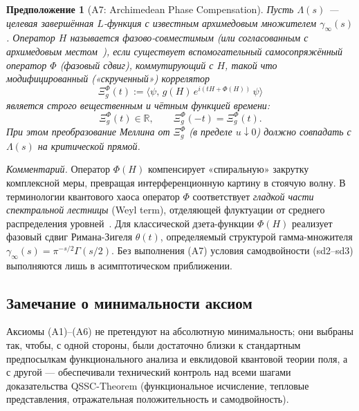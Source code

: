 \documentclass{article}
\numberwithin{equation}{section}
\theoremstyle{plain}
\newtheorem{assumption}{Предположение}[section]
\theoremstyle{definition}
\theoremstyle{remark}
\def\theta{θ}\def\Theta{Θ}\def\pi{π}\def\Pi{Π}%
\def\infty{∞}\def\partial{∂}\def\sum{Σ}\def\int{∫}%
\begin{document}
\begin{assumption}[A7: Archimedean Phase Compensation]
Пусть $\Lambda(s)$ — целевая завершённая $L$-функция с известным архимедовым множителем $\gamma_\infty(s)$.
Оператор $H$ называется \emph{фазово-совместимым} (или согласованным с архимедовым местом~\cite{Connes1999}), если существует вспомогательный самосопряжённый оператор $\Phi$ (фазовый сдвиг), коммутирующий с $H$, такой что модифицированный («скрученный») коррелятор
\begin{equation}
\label{eq:twisted_correlator}
\Xi_g^{\Phi}(t) := \big\langle \psi,\, g(H)\, e^{i(tH + \Phi(H))}\, \psi \big\rangle
\end{equation}
является строго вещественным и чётным функцией времени:
\begin{equation}
\Xi_g^{\Phi}(t) \in \mathbb{R}, \qquad \Xi_g^{\Phi}(-t) = \Xi_g^{\Phi}(t).
\end{equation}
При этом преобразование Меллина от $\Xi_g^{\Phi}$ (в пределе $u\downarrow 0$) должно совпадать с $\Lambda(s)$ на критической прямой.
\end{assumption}

\emph{Комментарий.}
Оператор $\Phi(H)$ компенсирует «спиральную» закрутку комплексной меры, превращая интерференционную картину в стоячую волну. В терминологии квантового хаоса оператор $\Phi$ соответствует \emph{гладкой части спектральной лестницы} (Weyl term), отделяющей флуктуации от среднего распределения уровней~\cite{BerryKeating1999}. Для классической дзета-функции $\Phi(H)$ реализует фазовый сдвиг Римана-Зигеля $\theta(t)$, определяемый структурой гамма-множителя $\gamma_\infty(s) = \pi^{-s/2}\Gamma(s/2)$. Без выполнения (A7) условия самодвойности (sd2–sd3) выполняются лишь в асимптотическом приближении.

\subsection*{Замечание о минимальности аксиом}

\noindent
Аксиомы (A1)–(A6) не претендуют на абсолютную минимальность; они выбраны так, чтобы, с одной стороны, были достаточно близки к стандартным предпосылкам функционального анализа и евклидовой квантовой теории поля, а с другой — обеспечивали технический контроль над всеми шагами доказательства QSSC-Theorem (функциональное исчисление, тепловые представления, отражательная положительность и самодвойность).
\end{document}
